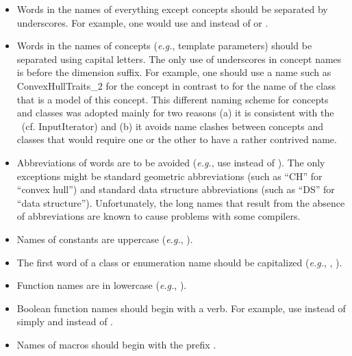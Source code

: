 \begin{itemize}
\item Words in the names of everything except concepts should be separated by
      underscores. For example, one would use  and
        instead of  or .
\item Words in the names of concepts (\textit{e.g.}, template parameters)
      should be separated using capital letters.  The only use of underscores
      in concept names is before the dimension suffix.  For example, one
      should use a name such as ConvexHullTraits\_2 for the concept
      in contrast to  for the name of the class that
      is a model of this concept.  This different naming scheme for concepts
      and classes was adopted mainly for two reasons (a) it is consistent with
      the \stl\ (cf. InputIterator) and (b) it avoids name clashes between
      concepts and classes that would require one or the other to have a
      rather contrived name.
\item Abbreviations of words are to be avoided%
      ({\em e.g.}, use
       instead of ).  The only exceptions
      might be standard geometric abbreviations (such as ``CH'' for ``convex
      hull'') and standard data structure abbreviations (such as ``DS'' for
      ``data structure'').  Unfortunately, the long names that result from
      the absence of abbreviations are known to cause problems with some
      compilers.
\item Names of constants are uppercase ({\em e.g.}, ).
      \ccModifierCrossRefOff
      \ccModifierCrossRefOn
\item The first word of a class or enumeration name should be capitalized
      ({\em e.g.}, , ).
\item Function names are in lowercase
      ({\em e.g.}, ).
\item Boolean function names should begin with a verb.  For example, use
       instead of simply  and
       instead of .%
\item Names of macros should begin with the prefix .
\end{itemize}

